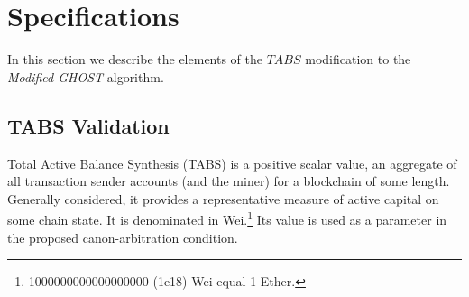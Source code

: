 \documentclass[11pt]{article}
\theoremstyle{plain}
\newcommand{\mghost}{\textit{Modified-GHOST }}
\begin{document}






\pagebreak
\section{\normalsize{Specifications}}\label{sec: specs}

In this section we describe the elements of the $TABS$ modification to the
\mghost algorithm.

\subsection{\small{TABS Validation}}


Total Active Balance Synthesis (TABS) is a positive scalar value,
an aggregate of all transaction sender accounts (and the miner) for a blockchain of some length.
Generally considered, it provides a representative measure of active capital on some chain state.
It is denominated in Wei.\footnote{
    1000000000000000000 (1e18) Wei equal 1 Ether. %
}
Its value is used as a parameter in the proposed canon-arbitration condition.
\end{document}
